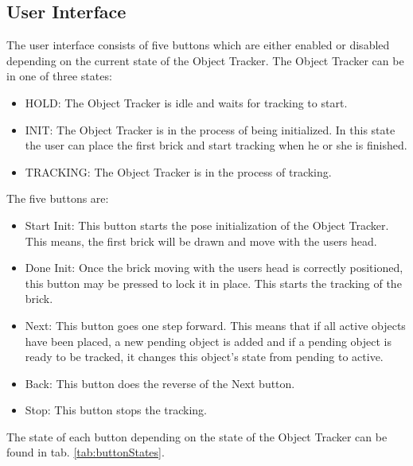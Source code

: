 \subsection{User Interface}

The user interface consists of five buttons which are either enabled or disabled depending on the current state of the Object Tracker. The Object Tracker can be in one of three states:

\begin{itemize}
    \item HOLD: The Object Tracker is idle and waits for tracking to start.
    \item INIT: The Object Tracker is in the process of being initialized. In this state the user can place the first brick and start tracking when he or she is finished.
    \item TRACKING: The Object Tracker is in the process of tracking. 
\end{itemize}

The five buttons are:

\begin{itemize}
    \item Start Init: This button starts the pose initialization of the Object Tracker. This means, the first brick will be drawn and move with the users head.
    \item Done Init: Once the brick moving with the users head is correctly positioned, this button may be pressed to lock it in place. This starts the tracking of the brick.
    \item Next: This button goes one step forward. This means that if all active objects have been placed, a new pending object is added and if a pending object is ready to be tracked, it changes this object's state from pending to active. 
    \item Back: This button does the reverse of the Next button.
    \item Stop: This button stops the tracking.
\end{itemize}

The state of each button depending on the state of the Object Tracker can be found in tab. \ref{tab:buttonStates}.

